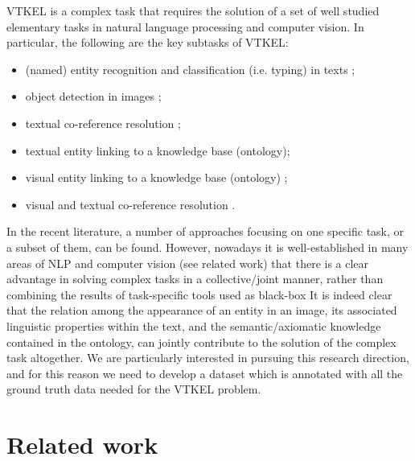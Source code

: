 \documentclass[11pt,a4paper]{article}
\begin{document}
VTKEL is a complex task that requires the solution of a set of well
studied elementary tasks in natural language processing and computer
vision. In particular, the following are the key subtasks of VTKEL:
\begin{itemize}
	\item (named) entity recognition and classification (i.e. typing) in texts \cite{goyal2018recent};
	\item object detection in images \cite{han2018advanced};
	\item textual co-reference resolution  \cite{sukthanker2018anaphora};
	\item textual entity linking to a knowledge base (ontology)\cite{shen2015entity};
	\item visual entity linking to a knowledge base (ontology) \cite{tilak2017visual};
	\item visual and textual co-reference resolution \cite{KongCVPR14,huang2017unsupervised,karpathy2015deep}.
\end{itemize}
In the recent literature, a number of approaches focusing on one
specific task, or a subset of them, can be found.  However, nowadays
it is well-established in many areas of NLP and computer vision (see
related work) that there is a clear advantage in solving complex tasks
in a collective/joint manner, rather than combining the results of
task-specific tools used as black-box It is indeed clear that the
relation among the appearance of an entity in an image, its associated
linguistic properties within the text, and the semantic/axiomatic
knowledge contained in the ontology, can jointly contribute to the
solution of the complex task altogether. We are particularly
interested in pursuing this research direction, and for this reason we
need to develop a dataset which is annotated with all the ground truth
data needed for the VTKEL problem.



\section{Related work}
\label{sec:related_work}

\end{document}
